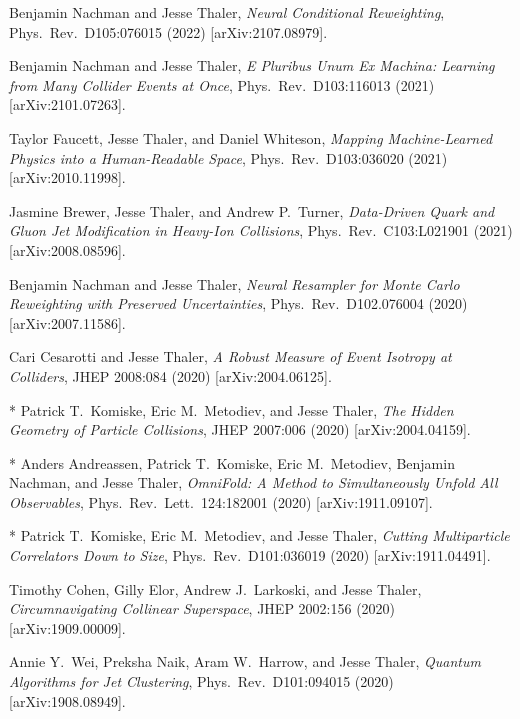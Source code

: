 \begin{list}{[]\addtocounter{jessecount}{-1}}{\leftmargin=3em \itemsep=4pt}
\item
 Benjamin Nachman and Jesse Thaler,
\emph{Neural Conditional Reweighting},
Phys.\ Rev.\ D105:076015 (2022)
[arXiv:2107.08979].

\item
 Benjamin Nachman and Jesse Thaler,
\emph{E Pluribus Unum Ex Machina: Learning from Many Collider Events at Once},
Phys.\ Rev.\ D103:116013 (2021)
[arXiv:2101.07263].

\item
 Taylor Faucett, Jesse Thaler, and Daniel Whiteson,
\emph{Mapping Machine-Learned Physics into a Human-Readable Space},
Phys.\ Rev.\ D103:036020 (2021)
[arXiv:2010.11998].

\item
 Jasmine Brewer, Jesse Thaler, and Andrew P.\ Turner,
\emph{Data-Driven Quark and Gluon Jet Modification in Heavy-Ion Collisions},
Phys.\ Rev.\ C103:L021901 (2021)
[arXiv:2008.08596].

\item
 Benjamin Nachman and Jesse Thaler,
\emph{Neural Resampler for Monte Carlo Reweighting with Preserved Uncertainties},
Phys.\ Rev.\ D102.076004 (2020)
[arXiv:2007.11586].

\item
 Cari Cesarotti and Jesse Thaler,
\emph{A Robust Measure of Event Isotropy at Colliders},
JHEP 2008:084 (2020)
[arXiv:2004.06125].

\item
* Patrick T.\ Komiske, Eric M.\ Metodiev, and Jesse Thaler,
\emph{The Hidden Geometry of Particle Collisions},
JHEP 2007:006 (2020)
[arXiv:2004.04159].

\item
* Anders Andreassen, Patrick T.\ Komiske, Eric M.\ Metodiev, Benjamin Nachman, and Jesse Thaler,
\emph{OmniFold: A Method to Simultaneously Unfold All Observables},
Phys.\ Rev.\ Lett.\ 124:182001 (2020)
[arXiv:1911.09107].

\item
* Patrick T.\ Komiske, Eric M.\ Metodiev, and Jesse Thaler,
\emph{Cutting Multiparticle Correlators Down to Size},
Phys.\ Rev.\ D101:036019 (2020)
[arXiv:1911.04491].

\item
 Timothy Cohen, Gilly Elor, Andrew J.\ Larkoski, and Jesse Thaler,
\emph{Circumnavigating Collinear Superspace},
JHEP 2002:156 (2020)
[arXiv:1909.00009].

\item
 Annie Y.\ Wei, Preksha Naik, Aram W.\ Harrow, and Jesse Thaler,
\emph{Quantum Algorithms for Jet Clustering},
Phys.\ Rev.\ D101:094015 (2020)
[arXiv:1908.08949].


\end{list}
